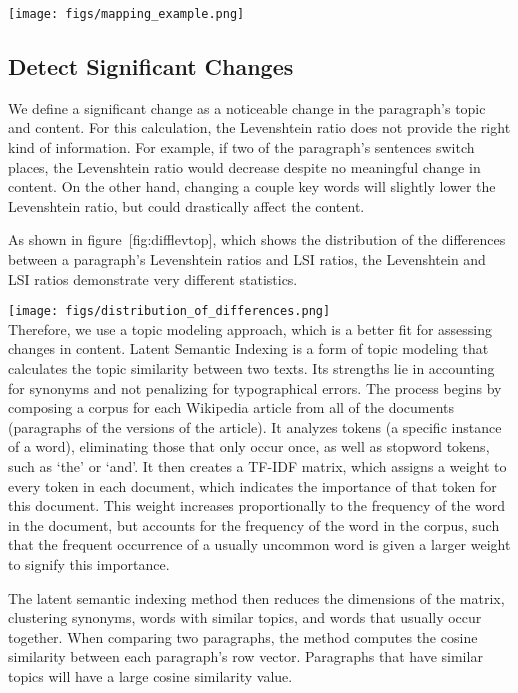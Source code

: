 \texttt{[image: figs/mapping\_example.png]}\\

\subsection{Detect Significant
Changes}\label{detect-significant-changes}

We define a significant change as a noticeable change in the paragraph's
topic and content. For this calculation, the Levenshtein ratio does not
provide the right kind of information. For example, if two of the
paragraph's sentences switch places, the Levenshtein ratio would
decrease despite no meaningful change in content. On the other hand,
changing a couple key words will slightly lower the Levenshtein ratio,
but could drastically affect the content.

As shown in figure~{[}fig:difflevtop{]}, which shows the distribution of
the differences between a paragraph's Levenshtein ratios and LSI ratios,
the Levenshtein and LSI ratios demonstrate very different statistics.

\texttt{[image: figs/distribution\_of\_differences.png]}\\

Therefore, we use a topic modeling approach, which is a better fit for
assessing changes in content. Latent Semantic Indexing is a form of
topic modeling that calculates the topic similarity between two texts.
Its strengths lie in accounting for synonyms and not penalizing for
typographical errors. The process begins by composing a corpus for each
Wikipedia article from all of the documents (paragraphs of the versions
of the article). It analyzes tokens (a specific instance of a word),
eliminating those that only occur once, as well as stopword tokens, such
as `the' or `and'. It then creates a TF-IDF matrix, which assigns a
weight to every token in each document, which indicates the importance
of that token for this document. This weight increases proportionally to
the frequency of the word in the document, but accounts for the
frequency of the word in the corpus, such that the frequent occurrence
of a usually uncommon word is given a larger weight to signify this
importance.

The latent semantic indexing method then reduces the dimensions of the
matrix, clustering synonyms, words with similar topics, and words that
usually occur together. When comparing two paragraphs, the method
computes the cosine similarity between each paragraph's row vector.
Paragraphs that have similar topics will have a large cosine similarity
value.

